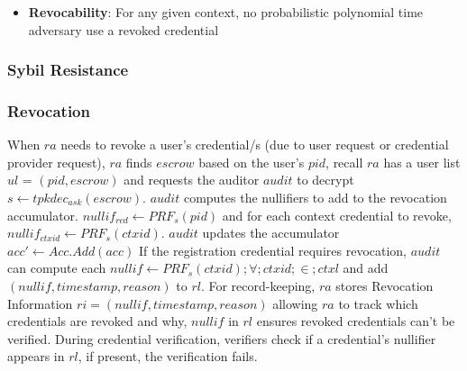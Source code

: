 {\begin{itemize}
    \item \textbf{Revocability}: For any given context, no probabilistic polynomial time adversary use a revoked credential 
\end{itemize}

\subsubsection{Sybil Resistance}

\subsubsection{Revocation}
When $ra$ needs to revoke a user's credential/s (due to user request or credential provider request), $ra$ finds $escrow$ based on the user's $pid$, recall $ra$ has a user list $ul$ = $(pid, escrow)$ and requests the auditor $audit$ to decrypt $s \gets tpkdec_{ask}(escrow)$. $audit$ computes the nullifiers to add to the revocation accumulator. $nullif_{rcd} \gets PRF_s(pid)$ and for each context credential to revoke, $nullif_{ctxid} \gets PRF_s(ctxid)$. $audit$ updates the accumulator $acc' \gets Acc.Add(acc)$
If the registration credential requires revocation, $audit$ can compute each $nullif \gets PRF_{s}(ctxid) ; \forall ; ctxid ; \in ; ctxl$ and add $(nullif, timestamp, reason)$ to $rl$. For record-keeping, $ra$ stores Revocation Information $ri = (nullif, timestamp, reason)$ allowing $ra$ to track which credentials are revoked and why, $nullif$ in $rl$ ensures revoked credentials can't be verified.
During credential verification, verifiers check if a credential's nullifier appears in $rl$, if present, the verification fails.














\newpage
}
